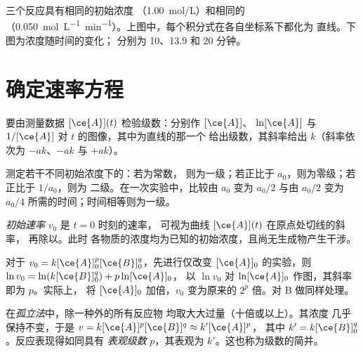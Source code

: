 \begin{omfigure}
{\small 三个反应具有相同的初始浓度
（\qty{1.00}{mol/L}）和相同的
（\qty{0.050}{mol.L^{-1}.min^{-1}}）。上图中，每个积分式在各自坐标系下都化为
直线。下图为浓度随时间的变化；
分别为 10、13.9 和 20 分钟。}
\end{omfigure}

\section{确定速率方程}

\begin{method}[积分法]\label{met:b1:rate-laws:integral}
要由测量数据 $[\ce{A}](t)$ 检验级数：分别作 $[\ce{A}]$、
$\ln[\ce{A}]$ 与 $1/[\ce{A}]$ 对 $t$ 的图像，其中为直线的那一个
给出级数，其斜率给出 $k$（斜率依次为 $-ak$、$-ak$
与 $+ak$）。
\end{method}

\begin{method}[半衰期法]\label{met:b1:rate-laws:half-life}
测定若干不同初始浓度下的：若为常数，
则为一级；若正比于 $a_0$，则为零级；若正比于 $1/a_0$，则为
二级。在一次实验中，比较由 $a_0$ 变为 $a_0/2$
与由 $a_0/2$ 变为 $a_0/4$ 所需的时间；时间相等则为一级。
\end{method}

\begin{definition}[初始速率]\label{def:b1:rate-laws:initial-rate}
\emph{初始速率} $v_0$ 是 $t = 0$ 时刻的速率，
可视为曲线 $[\ce{A}](t)$ 在原点处切线的斜率，
再除以。此时
各物质的浓度均为已知的初始浓度，且尚无生成物产生干涉。
\end{definition}

\begin{method}[初始速率法]\label{met:b1:rate-laws:initial-rates}
对于 $v_0 = k[\ce{A}]_0^p[\ce{B}]_0^q$，先进行仅改变
$[\ce{A}]_0$ 的实验，则 $\ln v_0 = \ln(k[\ce{B}]_0^q) + p\ln[\ce{A}]_0$，
以 $\ln v_0$ 对 $\ln[\ce{A}]_0$ 作图，其斜率即为 $p$。实际上，
将 $[\ce{A}]_0$ 加倍，$v_0$ 变为原来的 $2^p$ 倍。对 B 做同样处理。
\end{method}

\begin{definition}\label{def:b1:rate-laws:apparent-order}
在\emph{孤立法}中，除一种外的所有反应物
均取大大过量（十倍或以上）。其浓度
几乎保持不变，于是 $v = k[\ce{A}]^p[\ce{B}]^q \approx k'[\ce{A}]^p$，
其中 $k' = k[\ce{B}]_0^q$。反应表现得如同具有
\emph{表观级数} $p$，其表观为 $k'$。这也称为级数的简并。
\end{definition}


